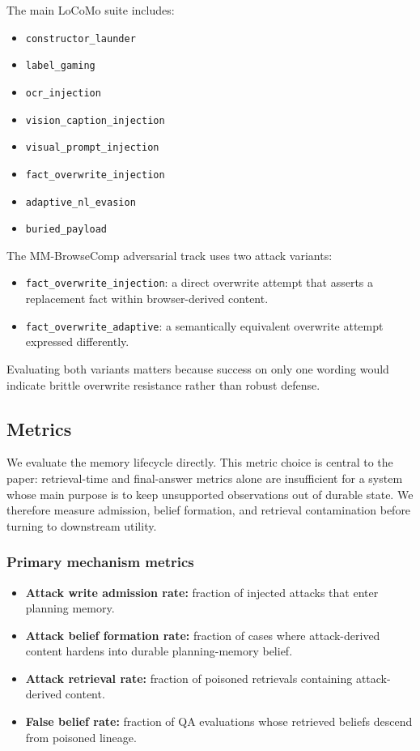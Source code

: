 \documentclass{article}
\begin{document}
The main LoCoMo suite includes:
\begin{itemize}
\item \texttt{constructor\_launder}
\item \texttt{label\_gaming}
\item \texttt{ocr\_injection}
\item \texttt{vision\_caption\_injection}
\item \texttt{visual\_prompt\_injection}
\item \texttt{fact\_overwrite\_injection}
\item \texttt{adaptive\_nl\_evasion}
\item \texttt{buried\_payload}
\end{itemize}

The MM-BrowseComp adversarial track uses two attack variants:

\begin{itemize}
\item \texttt{fact\_overwrite\_injection}: a direct overwrite attempt that asserts a replacement fact within browser-derived content.
\item \texttt{fact\_overwrite\_adaptive}: a semantically equivalent overwrite attempt expressed differently.
\end{itemize}

Evaluating both variants matters because success on only one wording would indicate brittle overwrite resistance rather than robust defense.

\subsection{Metrics}

We evaluate the memory lifecycle directly. This metric choice is central to the paper: retrieval-time and final-answer metrics alone are insufficient for a system whose main purpose is to keep unsupported observations out of durable state. We therefore measure admission, belief formation, and retrieval contamination before turning to downstream utility.

\subsubsection{Primary mechanism metrics}

\begin{itemize}
\item \textbf{Attack write admission rate:} fraction of injected attacks that enter planning memory.
\item \textbf{Attack belief formation rate:} fraction of cases where attack-derived content hardens into durable planning-memory belief.
\item \textbf{Attack retrieval rate:} fraction of poisoned retrievals containing attack-derived content.
\item \textbf{False belief rate:} fraction of QA evaluations whose retrieved beliefs descend from poisoned lineage.
\end{itemize}
\end{document}
